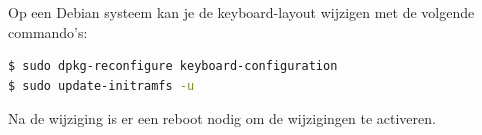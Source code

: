 Op een Debian systeem kan je de keyboard-layout wijzigen met de volgende commando's:
\begin{lstlisting}[language=bash]
$ sudo dpkg-reconfigure keyboard-configuration
$ sudo update-initramfs -u
\end{lstlisting}
Na de wijziging is er een reboot nodig om de wijzigingen te activeren.

